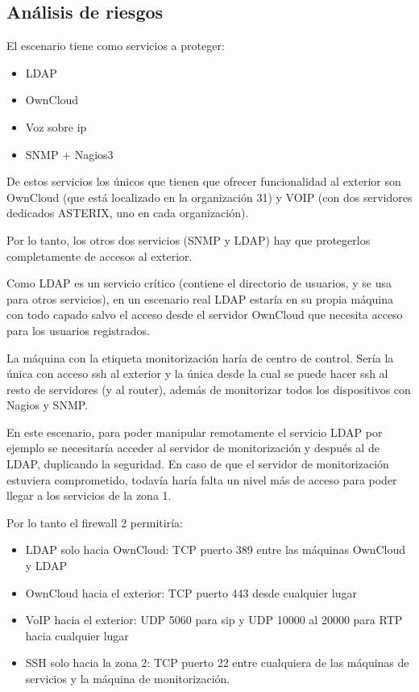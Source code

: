 \documentclass[]{article}
\begin{document}
\subsection{Análisis de riesgos}
El escenario tiene como servicios a proteger:

\begin{itemize}
	\item LDAP
	\item OwnCloud
	\item Voz sobre ip
	\item SNMP + Nagios3
\end{itemize}

De estos servicios los únicos que tienen que ofrecer funcionalidad al exterior son OwnCloud (que está localizado en la organización 31) y VOIP (con dos servidores dedicados ASTERIX, uno en cada organización).

Por lo tanto, los otros dos servicios (SNMP y LDAP) hay que protegerlos completamente de accesos al exterior. 

Como LDAP es un servicio crítico (contiene el directorio de usuarios, y se usa para otros servicios), en un escenario real LDAP estaría en su propia máquina con todo capado salvo el acceso desde el servidor OwnCloud que necesita acceso para los usuarios registrados.

La máquina con la etiqueta monitorización haría de centro de control. Sería la única con acceso ssh al exterior y la única desde la cual se puede hacer ssh al resto de servidores (y al router), además de monitorizar todos los dispositivos con Nagios y SNMP.

En este escenario, para poder manipular remotamente el servicio LDAP por ejemplo se necesitaría acceder al servidor de monitorización y después al de LDAP, duplicando la seguridad. En caso de que el servidor de monitorización estuviera comprometido, todavía haría falta un nivel más de acceso para poder llegar a los servicios de la zona 1.

Por lo tanto el firewall 2 permitiría:

\begin{itemize}
	\item LDAP solo hacia OwnCloud: TCP puerto 389 entre las máquinas OwnCloud y LDAP
	\item OwnCloud hacia el exterior: TCP puerto 443 desde cualquier lugar
	\item VoIP hacia el exterior: UDP 5060 para sip y UDP 10000 al 20000 para RTP hacia cualquier lugar
	\item SSH solo hacia la zona 2: TCP puerto 22 entre cualquiera de las máquinas de servicios y la máquina de monitorización.
\end{itemize}
\end{document}
